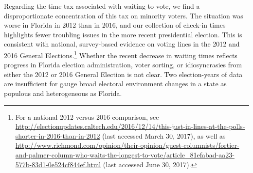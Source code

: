 \documentclass[12pt,titlepage]{article}
\begin{document}



Regarding the time tax associated with waiting to vote, we find a
disproportionate concentration of this tax on minority voters.  The
situation was worse in Florida in 2012 than in 2016, and our
collection of check-in times highlights fewer troubling issues in the
more recent presidential election.  This is consistent with national,
survey-based evidence on voting lines in the 2012 and 2016 General
Elections.\footnote{For a national 2012 versus 2016 comparison, see
  \url{http://electionupdates.caltech.edu/2016/12/14/this-just-in-lines-at-the-polls-shorter-in-2016-than-in-2012}
  (last accessed March 30, 2017), as well as
  \url{http://www.richmond.com/opinion/their-opinion/guest-columnists/fortier-and-palmer-column-who-waits-the-longest-to-vote/article_81efabad-aa23-577b-83d1-0e524cf844ef.html}
  (last accessed June 30, 2017).} Whether the recent decrease in
waiting times reflects progress in Florida election administration,
voter sorting, or idiosyncrasies from either the 2012 or 2016 General
Election is not clear. Two election-years of data are insufficient for
gauge broad electoral environment changes in a state as populous and
heterogeneous as Florida.
\end{document}
